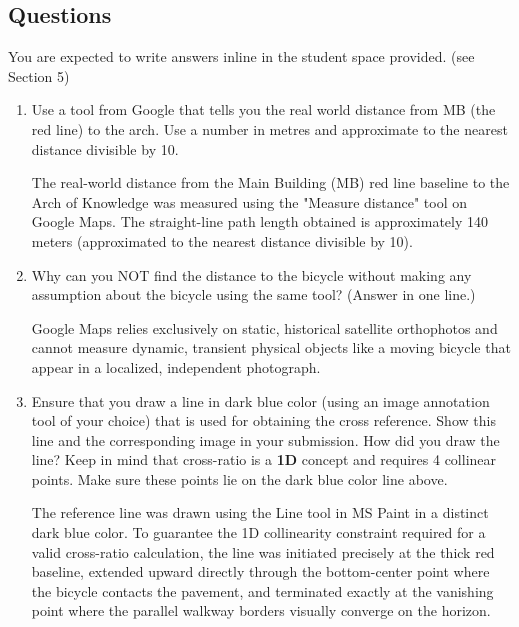 \subsection{Questions}

You are expected to write answers inline in the student space provided. (see Section 5)

\begin{enumerate}
\item Use a tool from Google that tells you the real world distance from MB (the red line) to the arch.  Use a number in metres and approximate to the nearest distance divisible by 10.

\begin{studentSpace}
    The real-world distance from the Main Building (MB) red line baseline to the Arch of Knowledge was measured using the "Measure distance" tool on Google Maps. The straight-line path length obtained is approximately 140 meters (approximated to the nearest distance divisible by 10).
\end{studentSpace}

\item Why can you NOT find the distance to the bicycle without making any assumption about the bicycle using the same tool? (Answer in one line.)

\begin{studentSpace}
    Google Maps relies exclusively on static, historical satellite orthophotos and cannot measure dynamic, transient physical objects like a moving bicycle that appear in a localized, independent photograph.
\end{studentSpace}

\item Ensure that you draw a line in dark blue color (using an image annotation tool of your choice) that is used for obtaining the cross reference.  Show this line and the corresponding image in your submission. How did you draw the line? Keep in mind that cross-ratio is a \textbf{1D} concept and requires 4 collinear points. Make sure these points lie on the dark blue color line above.

\begin{studentSpace}
    The reference line was drawn using the Line tool in MS Paint in a distinct dark blue color. To guarantee the 1D collinearity constraint required for a valid cross-ratio calculation, the line was initiated precisely at the thick red baseline, extended upward directly through the bottom-center point where the bicycle contacts the pavement, and terminated exactly at the vanishing point where the parallel walkway borders visually converge on the horizon.
\end{studentSpace}


\end{enumerate}
